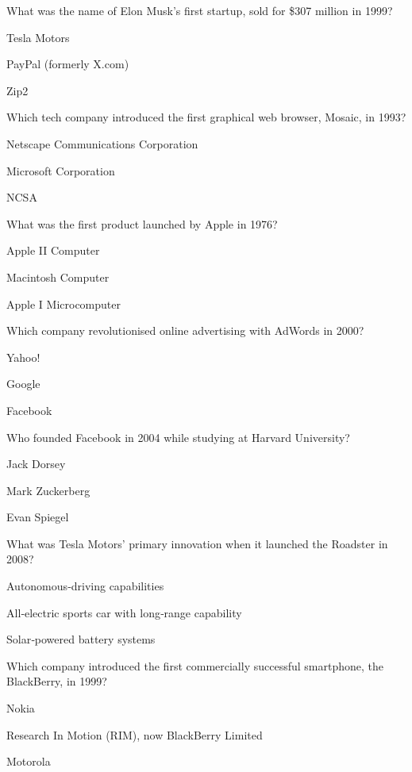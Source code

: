 \begin{enhancedmcq}{What was the name of Elon Musk's first startup, sold for \$307 million in 1999?}
\item Tesla Motors
\item PayPal (formerly X.com)
\item Zip2

\end{enhancedmcq}
\begin{enhancedmcq}{Which tech company introduced the first graphical web browser, Mosaic, in 1993?}
\item Netscape Communications Corporation
\item Microsoft Corporation
\item NCSA

\end{enhancedmcq}
\begin{enhancedmcq}{What was the first product launched by Apple in 1976?}
\item Apple II Computer
\item Macintosh Computer
\item Apple I Microcomputer

\end{enhancedmcq}
\begin{enhancedmcq}{Which company revolutionised online advertising with AdWords in 2000?}
\item Yahoo!
\item Google
\item Facebook

\end{enhancedmcq}
\begin{enhancedmcq}{Who founded Facebook in 2004 while studying at Harvard University?}
\item Jack Dorsey
\item Mark Zuckerberg
\item Evan Spiegel

\end{enhancedmcq}
\begin{enhancedmcq}{What was Tesla Motors' primary innovation when it launched the Roadster in 2008?}
\item Autonomous‑driving capabilities
\item All‑electric sports car with long‑range capability
\item Solar‑powered battery systems

\end{enhancedmcq}
\begin{enhancedmcq}{Which company introduced the first commercially successful smartphone, the BlackBerry, in 1999?}
\item Nokia
\item Research In Motion (RIM), now BlackBerry Limited
\item Motorola

\end{enhancedmcq}
